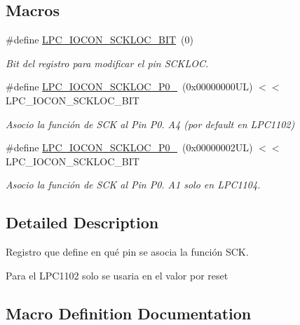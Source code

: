 \subsection*{Macros}
\begin{DoxyCompactItemize}
\item 
\#define \hyperlink{group___l_p_c___i_o_c_o_n___l_p_c1102___s_c_k___l_o_c_ga831c058cf3b0a147b5833bfac8ddce82}{L\+P\+C\+\_\+\+I\+O\+C\+O\+N\+\_\+\+S\+C\+K\+L\+O\+C\+\_\+\+B\+IT}~(0)
\begin{DoxyCompactList}\small\item\em Bit del registro para modificar el pin S\+C\+K\+L\+OC. \end{DoxyCompactList}\item 
\#define \hyperlink{group___l_p_c___i_o_c_o_n___l_p_c1102___s_c_k___l_o_c_gaba2d4230db5fd5477c8f1bd850d90963}{L\+P\+C\+\_\+\+I\+O\+C\+O\+N\+\_\+\+S\+C\+K\+L\+O\+C\+\_\+\+P0\+\_}~(0x00000000\+U\+L) $<$$<$ L\+P\+C\+\_\+\+I\+O\+C\+O\+N\+\_\+\+S\+C\+K\+L\+O\+C\+\_\+\+B\+IT
\begin{DoxyCompactList}\small\item\em Asocio la función de S\+CK al Pin P0. A4 (por default en L\+P\+C1102) \end{DoxyCompactList}\item 
\#define \hyperlink{group___l_p_c___i_o_c_o_n___l_p_c1102___s_c_k___l_o_c_gaa6d2e11946beb81a3e4260e789fe67fe}{L\+P\+C\+\_\+\+I\+O\+C\+O\+N\+\_\+\+S\+C\+K\+L\+O\+C\+\_\+\+P0\+\_}~(0x00000002\+U\+L) $<$$<$ L\+P\+C\+\_\+\+I\+O\+C\+O\+N\+\_\+\+S\+C\+K\+L\+O\+C\+\_\+\+B\+IT
\begin{DoxyCompactList}\small\item\em Asocio la función de S\+CK al Pin P0. A1 solo en L\+P\+C1104. \end{DoxyCompactList}\end{DoxyCompactItemize}


\subsection{Detailed Description}
Registro que define en qué pin se asocia la función S\+CK. 

Para el L\+P\+C1102 solo se usaria en el valor por reset 

\subsection{Macro Definition Documentation}
